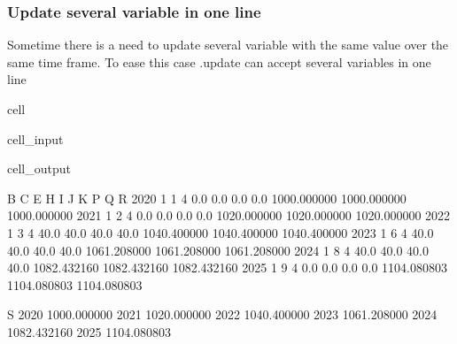 \documentclass[letterpaper,10pt,english]{jupyterBook}
\begin{document}
\subsubsection{Update several variable in one line}
\label{\detokenize{content/04_PythonEssentials/UpdateCommand:update-several-variable-in-one-line}}
\sphinxAtStartPar
Sometime there is a need to update several variable with the same value over the same time frame. To ease this case .update can accept several variables in one line

\begin{sphinxuseclass}{cell}\begin{sphinxVerbatimInput}

\begin{sphinxuseclass}{cell_input}
\begin{sphinxVerbatim}[commandchars=\\\{\}]
\end{sphinxVerbatim}

\end{sphinxuseclass}\end{sphinxVerbatimInput}
\begin{sphinxVerbatimOutput}

\begin{sphinxuseclass}{cell_output}
\begin{sphinxVerbatim}[commandchars=\\\{\}]
      B  C  E     H     I     J     K            P            Q            R   
2020  1  1  4   0.0   0.0   0.0   0.0  1000.000000  1000.000000  1000.000000  \PYGZbs{}
2021  1  2  4   0.0   0.0   0.0   0.0  1020.000000  1020.000000  1020.000000   
2022  1  3  4  40.0  40.0  40.0  40.0  1040.400000  1040.400000  1040.400000   
2023  1  6  4  40.0  40.0  40.0  40.0  1061.208000  1061.208000  1061.208000   
2024  1  8  4  40.0  40.0  40.0  40.0  1082.432160  1082.432160  1082.432160   
2025  1  9  4   0.0   0.0   0.0   0.0  1104.080803  1104.080803  1104.080803   

                S  
2020  1000.000000  
2021  1020.000000  
2022  1040.400000  
2023  1061.208000  
2024  1082.432160  
2025  1104.080803  
\end{sphinxVerbatim}

\end{sphinxuseclass}\end{sphinxVerbatimOutput}

\end{sphinxuseclass}
\sphinxAtStartPar
{}
\end{document}

